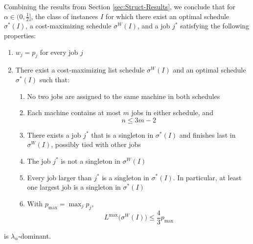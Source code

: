 \documentclass[%
english, titlepage=false %
]{./tum-templates/book/tumbook}
\begin{document}
\begin{framed}
Combining the results from Section \ref{sec:Struct-Results}, we conclude that for
$\alpha\in\Big(0,\frac12\Big]$, the class of instances $I$ for which there
exist an optimal schedule $\sigma^*(I)$, a cost-maximizing schedule
$\sigma^W(I)$, and a job $j^*$ satisfying the following properties:

\begin{enumerate}[label=(\roman*)]
    \item \(w_j=p_j\) for every job \(j\)

    \item There exist a cost-maximizing list schedule
      \(\sigma^{W}(I)\) and an optimal schedule
      \(\sigma^{*}(I)\) such that:
      \begin{enumerate}[label=(\alph*)]
          \item No two jobs are assigned to the same machine
                in both schedules

          \item Each machine contains at most \(m\) jobs
                in either schedule, and
                \[
                    n \leq 3m-2
                \]

          \item There exists a job \(j^*\) that is a singleton
                in \(\sigma^{*}(I)\) and finishes last
                in \(\sigma^{W}(I)\), possibly tied with
                other jobs

          \item The job \(j^*\) is not a singleton
                in \(\sigma^{W}(I)\)

          \item Every job larger than \(j^*\) is a singleton
                in \(\sigma^{*}(I)\). In particular, at least
                one largest job is a singleton in
                \(\sigma^{*}(I)\)

          \item With \(p_{\max}=\max_j p_j\),
                \[
                    L^{\max}\bigl(\sigma^{W}(I)\bigr)
                    \leq \frac43 p_{\max}
                \]
      \end{enumerate}
\end{enumerate}
is $\lambda_\alpha$-dominant.
\end{framed}
\end{document}

